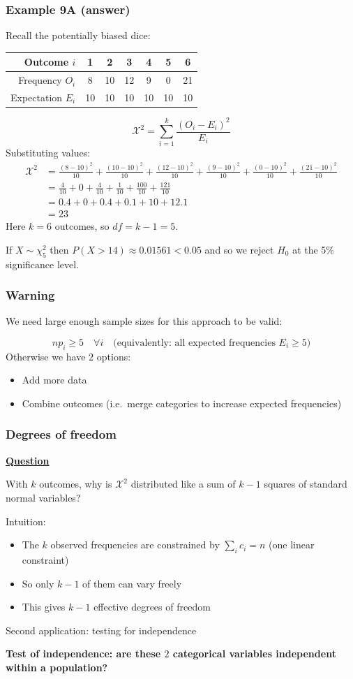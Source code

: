\documentclass[t,8pt]{beamer}
\begin{document}
\begin{frame}
	\frametitle{Example 9A (answer)}
	Recall the potentially biased dice:
	\begin{center}
		\begin{tabular}{r|cccccc}
			Outcome $i$ & 1 & 2 & 3 & 4 & 5 & 6 \\ \hline
			Frequency $O_i$ & 8 & 10 & 12 & 9 & 0 & 21 \\ 
			Expectation $E_i$ & 10 & 10 & 10 & 10 & 10 & 10 \\ 
		\end{tabular}
	\end{center}
	\[
	\mathcal{X}^2 = \sum_{i=1}^k \frac{(O_i - E_i)^2}{E_i}
	\]
	Substituting values:
	\begin{align*}
		\mathcal{X}^2 &= \frac{(8 - 10)^2}{10} + \frac{(10 - 10)^2}{10} + \frac{(12 - 10)^2}{10} + \frac{(9 - 10)^2}{10} + \frac{(0-10)^2}{10} + \frac{(21 - 10)^2}{10} \\
		&= \frac{4}{10} + 0 + \frac{4}{10} + \frac{1}{10} + \frac{100}{10} + \frac{121}{10} \\
		&= 0.4 + 0 + 0.4 + 0.1 + 10 + 12.1 \\
		&= 23
	\end{align*}
	Here $k=6$ outcomes, so $df=k-1=5$. \par
	If $X\sim\chi^2_{5}$ then $P(X>14)\approx 0.01561<0.05$ and so we reject $H_0$ at the 5\% significance level.
\end{frame}

\begin{frame}
	\frametitle{Warning}
	We need large enough sample sizes for this approach to be valid: \par
	$$np_i\geq 5\quad\forall i\quad\text{(equivalently: all expected frequencies }E_i\geq 5)$$
	Otherwise we have $2$ options:
	\begin{itemize}
		\item Add more data
		\item Combine outcomes (i.e.\ merge categories to increase expected frequencies)
	\end{itemize}
\end{frame}

\begin{frame}
	\frametitle{Degrees of freedom}
	{\bf\underline{Question}} \par
	With $k$ outcomes, why is $\mathcal{X}^2$ distributed like a sum of $k-1$ squares of standard normal variables? \par
	Intuition:
	\begin{itemize}
		\item The $k$ observed frequencies are constrained by $\sum_i c_i=n$ (one linear constraint)
		\item So only $k-1$ of them can vary freely
		\item This gives $k-1$ effective degrees of freedom
	\end{itemize}
	Second application: testing for independence \par
	{\bf Test of independence: are these $2$ categorical variables independent within a population?}
\end{frame}
\end{document}
